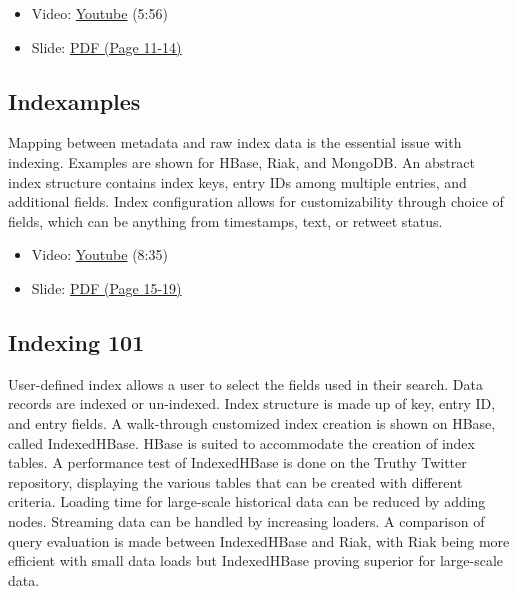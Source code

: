 \begin{itemize}

\item
  Video: \href{https://www.youtube.com/watch?v=NDjAdFSVzxo}{Youtube}
  (5:56)
\item
  Slide:
  \href{https://drive.google.com/open?id=0B88HKpainTSfWUh6dVNHcXloSnc}{PDF
  (Page 11-14)}
\end{itemize}

\subsection{Indexamples}\label{indexamples}

Mapping between metadata and raw index data is the essential issue with
indexing. Examples are shown for HBase, Riak, and MongoDB. An abstract
index structure contains index keys, entry IDs among multiple entries,
and additional fields. Index configuration allows for customizability
through choice of fields, which can be anything from timestamps, text,
or retweet status.

\begin{itemize}

\item
  Video: \href{https://www.youtube.com/watch?v=Ec3VFeTGuo8}{Youtube}
  (8:35)
\item
  Slide:
  \href{https://drive.google.com/open?id=0B88HKpainTSfWUh6dVNHcXloSnc}{PDF
  (Page 15-19)}
\end{itemize}

\subsection{Indexing 101}\label{indexing-101}

User-defined index allows a user to select the fields used in their
search. Data records are indexed or un-indexed. Index structure is made
up of key, entry ID, and entry fields. A walk-through customized index
creation is shown on HBase, called IndexedHBase. HBase is suited to
accommodate the creation of index tables. A performance test of
IndexedHBase is done on the Truthy Twitter repository, displaying the
various tables that can be created with different criteria. Loading time
for large-scale historical data can be reduced by adding nodes.
Streaming data can be handled by increasing loaders. A comparison of
query evaluation is made between IndexedHBase and Riak, with Riak being
more efficient with small data loads but IndexedHBase proving superior
for large-scale data.

